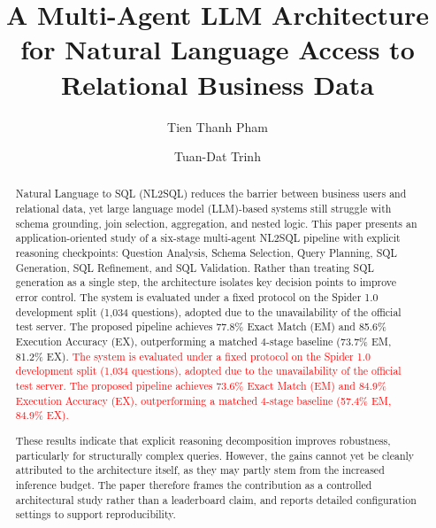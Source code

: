 \documentclass{svproc}
\begin{document}
\mainmatter              %
%
\title{A Multi-Agent LLM Architecture for Natural Language Access to Relational Business Data}
%
%
\author{Tien Thanh Pham \and Tuan-Dat Trinh}
%
%
%

\maketitle              %

\begin{abstract}
Natural Language to SQL (NL2SQL) reduces the barrier between business users and relational data, yet large language model (LLM){-}based systems still struggle with schema grounding, join selection, aggregation, and nested logic.
This paper presents an application-oriented study of a six-stage multi-agent NL2SQL pipeline with explicit reasoning checkpoints: Question Analysis, Schema Selection, Query Planning, SQL Generation, SQL Refinement, and SQL Validation. Rather than treating SQL generation as a single step, the architecture isolates key decision points to improve error control.
The system is evaluated under a fixed protocol on the Spider 1.0 development split (1,034 questions), adopted due to the unavailability of the official test server. The proposed pipeline achieves 77.8\% Exact Match (EM) and 85.6\% Execution Accuracy (EX), outperforming a matched 4-stage baseline (73.7\% EM, 81.2\% EX).
\textcolor{red}{The system is evaluated under a fixed protocol on the Spider 1.0 development split (1,034 questions), adopted due to the unavailability of the official test server. The proposed pipeline achieves 73.6\% Exact Match (EM) and 84.9\% Execution Accuracy (EX), outperforming a matched 4-stage baseline (57.4\% EM, 84.9\% EX).}

These results indicate that explicit reasoning decomposition improves robustness, particularly for structurally complex queries. However, the gains cannot yet be cleanly attributed to the architecture itself, as they may partly stem from the increased inference budget.
The paper therefore frames the contribution as a controlled architectural study rather than a leaderboard claim, and reports detailed configuration settings to support reproducibility.

\end{abstract}
\end{document}
